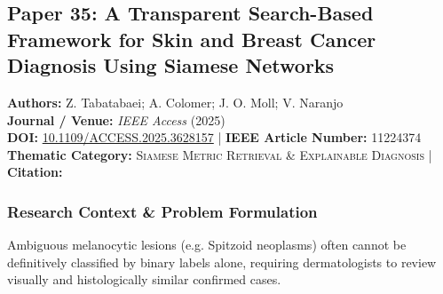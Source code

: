 \subsection{Paper 35: A Transparent Search-Based Framework for Skin and Breast Cancer Diagnosis Using Siamese Networks}
\label{sec:paper_35}

\begin{tcolorbox}[colback=gray!5!white,colframe=gray!75!black,title=\textbf{Metadata \& Citation Summary}]
\textbf{Authors:} Z. Tabatabaei; A. Colomer; J. O. Moll; V. Naranjo \\
\textbf{Journal / Venue:} \textit{IEEE Access} (2025) \\
\textbf{DOI:} \href{https://doi.org/10.1109/ACCESS.2025.3628157}{10.1109/ACCESS.2025.3628157} \quad | \quad \textbf{IEEE Article Number:} 11224374 \\
\textbf{Thematic Category:} \textsc{Siamese Metric Retrieval \& Explainable Diagnosis} \quad | \quad \textbf{Citation:} \cite{11224374}
\end{tcolorbox}

\subsubsection*{Research Context \& Problem Formulation}
Ambiguous melanocytic lesions (e.g. Spitzoid neoplasms) often cannot be definitively classified by binary labels alone, requiring dermatologists to review visually and histologically similar confirmed cases.

